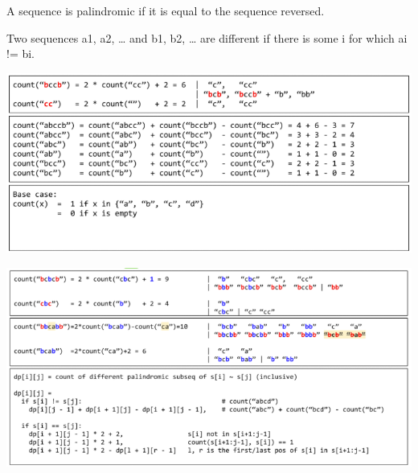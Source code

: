 \documentclass[9pt, b5paaper]{book}
\begin{document}
A sequence is palindromic if it is equal to the sequence reversed.

Two sequences a1, a2, \ldots{} and b1, b2, \ldots{} are different if there is some i for which ai != bi.

\includegraphics[width=.9\linewidth]{./pic/palindromSubSeq.png}

\includegraphics[width=.9\linewidth]{./pic/palindromSubSeq2.png}
\end{document}
